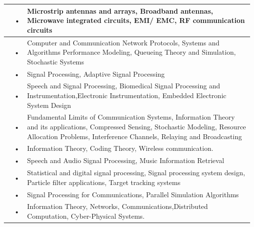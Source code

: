 \documentclass[openany]{book} %
\begin{document}
\begin{tabular}{p{3.5cm} p{3.5cm}p{9cm}}
\hline 
\hline 
\href{https://www.ee.iitb.ac.in/wiki/faculty/gkumar}{\color{blue}{Prof. Girish Kumar }} & • & Microstrip antennas and arrays, Broadband antennas, Microwave integrated circuits, EMI/ EMC, RF communication circuits \\ 
\hline 
\href{https://www.ee.iitb.ac.in/~dmanju/}{\color{blue}{Prof. D. Manjunath }}& • & Computer and Communication Network Protocols, Systems and Algorithms Performance Modeling, Queueing Theory and Simulation, Stochastic
Systems \\ 
\hline 
\href{https://www.ee.iitb.ac.in/wiki/faculty/merchant}{\color{blue}{Prof. Shabbir Merchant }}& • & Signal Processing, Adaptive Signal Processing \\ 
\hline 
\href{https://www.ee.iitb.ac.in/~pcpandey/}{\color{blue}{Prof. Prem C. Pandey }}& • & Speech and Signal Processing, Biomedical Signal Processing and Instrumentation,Electronic Instrumentation, Embedded Electronic System Design \\ 
\hline 
\href{https://www.ee.iitb.ac.in/wiki/faculty/bsraj}{\color{blue}{Prof. Sibi Raj B Pillai  }}& • & Fundamental Limits of Communication Systems, Information Theory and its applications, Compressed Sensing, Stochastic Modeling, Resource Allocation Problems, Interference Channels, Relaying and Broadcasting \\ 
\hline 
\href{https://www.ee.iitb.ac.in/wiki/faculty/bikash}{\color{blue}{Prof. Bikash Kumar Dey }}& • & Information Theory, Coding Theory, Wireless communication. \\ 
\hline 
\href{https://www.ee.iitb.ac.in/wiki/faculty/prao}{\color{blue}{Prof. Preeti Rao }}& • & Speech and Audio Signal Processing, Music Information Retrieval \\ \hline 
\href{https://www.ee.iitb.ac.in/web/faculty/homepage/rajbabu}{\color{blue}{Prof. Rajbabu Velmurugan }}& • & Statistical and digital signal processing, Signal processing system design, Particle filter applications, Target tracking systems \\ 
\hline 
\href{https://www.ee.iitb.ac.in/~sarva/}{\color{blue}{Prof. Saravanan Vijayakumaran}} & • & Signal Processing for Communications, Parallel Simulation Algorithms \\ 
\hline 
\href{https://sites.google.com/site/nikhilkaram/}{\color{blue}{Prof. Nikhil Karamchandani }}& • & Information Theory, Networks, Communications,Distributed Computation, Cyber-Physical Systems. \\ 

\end{tabular}
\end{document}
